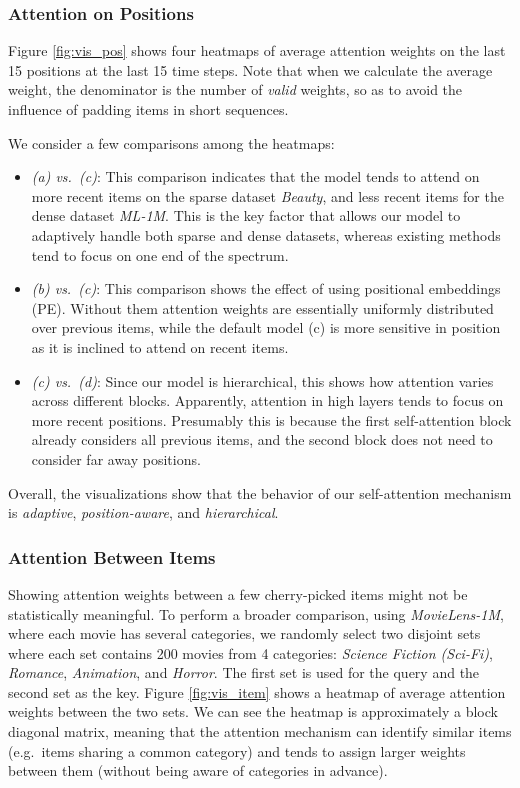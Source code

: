 \documentclass[conference]{IEEEtran}
\newcommand{\xhdr}[1]{\subsubsection*{\bf #1}}
\begin{document}
\xhdr{Attention on Positions}

Figure \ref{fig:vis_pos} shows four heatmaps of average attention weights on the last 15 positions at the last 15 time steps. Note that when we calculate 
the 
average weight, the denominator is 
the
number of \emph{valid} weights, 
so as to
avoid the influence of padding items in short sequences.

We consider a few comparisons among the heatmaps:
\begin{itemize}
\item \emph{(a) vs.~(c)}: This comparison indicates that the model tends to attend on more recent items on the sparse dataset \emph{Beauty}, 
and less recent items for 
the dense dataset \emph{ML-1M}.
This is the key factor 
that allows our model
to adaptively handle both sparse and dense datasets, 
whereas existing methods tend to focus on one end of the spectrum.

\item \emph{(b) vs.~(c)}: This comparison shows the effect of using positional embeddings (PE). Without 
them
attention weights 
are essentially
uniformly distributed over previous items, while the default model (c) is more sensitive in position 
as it is
inclined to attend on recent items. 


\item \emph{(c) vs.~(d)}: Since our model is hierarchical, this shows how 
attention 
varies
across different blocks. Apparently, attention in high layers tends to focus on more recent positions. 
Presumably this is
because the first self-attention block already considers all previous items, and the second block does not need to consider far away positions. 
\end{itemize}

Overall, the visualizations show that the behavior of our self-attention mechanism is \emph{adaptive}, \emph{position-aware}, and \emph{hierarchical}. 

\xhdr{Attention Between Items}

Showing attention weights between a few cherry-picked items might not be statistically meaningful. To perform a broader comparison, using \emph{MovieLens-1M}, where each movie has several categories, we randomly select two disjoint sets where each set contains 200 movies 
from 4 categories: \emph{Science Fiction (Sci-Fi)}, \emph{Romance}, \emph{Animation}, and \emph{Horror}. The first set is used for the query and the second set 
as the key. Figure \ref{fig:vis_item} shows a heatmap of average attention weights between the two sets. We can see the heatmap is approximately a block diagonal matrix, meaning that the attention mechanism can identify similar items (e.g.~items sharing a common category) and tends to assign larger weights between them (without being aware of categories in advance).
\end{document}
